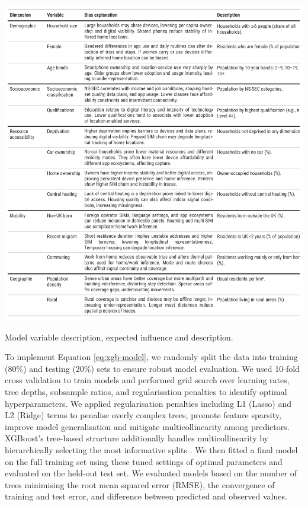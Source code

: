 \documentclass[]{rsos}%
\begin{document}
\begin{table}[h]
\centering
\includegraphics[width=1\linewidth]{figures/01_table-variable-dictionary_explain.png}
\caption{Model variable description, expected influence and description.}
\label{tab:covariates}
\end{table}

To implement Equation \ref{eq:xgb-model}, we randomly split the data
into training (80\%) and testing (20\%) sets to ensure robust model
evaluation. We used 10-fold cross validation to train models and
performed grid search over learning rates, tree depths, subsample
ratios, and regularisation penalties to identify optimal
hyperparameters. We applied regularisation penalties including L1
(Lasso) and L2 (Ridge) terms to penalise overly complex trees, promote
feature sparsity, improve model generalisation and mitigate
multicollinearity among predictors. XGBoost's tree-based structure
additionally handles multicollinearity by hierarchically selecting the
most informative splits \citep{chen2016}. We then fitted a final model on the
full training set using these tuned settings of optimal parameters and
evaluated on the held-out test set. We evaluated models based on the
number of trees minimising the root mean squared error (RMSE), the
convergence of training and test error, and difference between predicted
and observed values.
\end{document}
